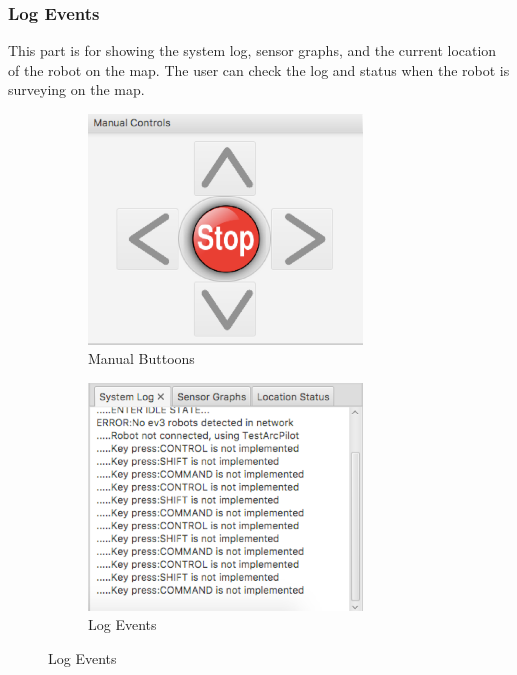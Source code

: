\documentclass[10pt,a4paper,titlepage]{article}
\begin{document}
  
  \subsubsection{Log Events} 
This part is for showing the system log, sensor graphs, and the current location of the robot on the map. The user can check the log and status when the robot is surveying on the map.  

\begin{figure}[H]
	\centering
	\begin{subfigure}[t]{0.45\textwidth}
  \includegraphics[width=0.8\textwidth]{buttons.png}  %
\caption{Manual Buttoons} 
\label{fig:Manual Buttoons}                
	\end{subfigure}
	\begin{subfigure}[t]{0.45\textwidth}
  \includegraphics[width=0.8\textwidth]{log.png}  %
\caption{Log Events} 
\label{fig:Log Events}              
	\end{subfigure}
\end{figure}
   
\end{document}
